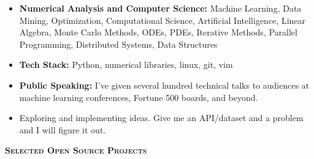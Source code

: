 \documentclass[letterpaper, 11pt]{article}
\renewcommand{\section}[1]{%
  \begin{tcolorbox}
    \textsc{\textbf{\large{#1}}}
  \end{tcolorbox}
}
\begin{document}
\begin{itemize}

\item {\bf Numerical Analysis and Computer Science:} Machine Learning, Data Mining, Optimization, Computational Science, Artificial Intelligence, Linear Algebra, Monte Carlo Methods, ODEs, PDEs, Iterative Methods, Parallel Programming, Distributed Systems, Data Structures

\item {\bf Tech Stack:} Python, numerical libraries, linux, git, vim

\item {\bf Public Speaking:} I've given several hundred technical talks to audiences at machine learning conferences, Fortune 500 boards, and beyond.

\item Exploring and implementing ideas. Give me an API/dataset and a problem and I will figure it out.

\end{itemize}


\section{Selected Open Source Projects}

\end{document}
